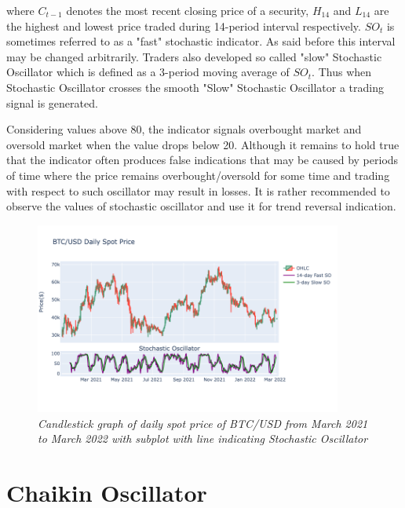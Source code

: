 where $C_{t-1}$ denotes the most recent closing price of a security, $H_{14}$ and $L_{14}$ are the highest and lowest price traded during 14-period interval respectively. $SO_{t}$ is sometimes referred to as a "fast" stochastic indicator. As said before this interval may be changed arbitrarily. Traders also developed so called "slow" Stochastic Oscillator which is defined as a 3-period moving average of $SO_{t}$. Thus when Stochastic Oscillator crosses the smooth "Slow" Stochastic Oscillator a trading signal is generated.

Considering values above 80, the indicator signals overbought market and oversold market when the value drops below 20. Although it remains to hold true that the indicator often produces false indications that may be caused by periods of time where the price remains overbought/oversold for some time and trading with respect to such oscillator may result in losses. It is rather recommended to observe the values of stochastic oscillator and use it for trend reversal indication. 

\begin{figure}[h]

\begin{center}
	\includegraphics[width=0.9\textwidth]{Stochastic.png}
\end{center}

\caption{\textit{ Candlestick graph of daily spot price of BTC/USD from March 2021 to March 2022 with subplot with line indicating Stochastic Oscillator}}

\end{figure}

\newpage

\section{Chaikin Oscillator}

